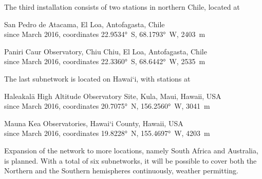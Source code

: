         The third installation consists of two stations in northern Chile, located at
        \begin{description}[leftmargin = 25mm]
            \item[SP]       San Pedro de Atacama, El Loa, Antofagasta, Chile\\
                            since March 2016, coordinates \ang{22.9534}~S, \ang{68.1793}~W, \SI{2403}{\metre}
            \item[PC]       Paniri Caur Observatory, Chiu Chiu, El Loa, Antofagasta, Chile\\
                            since March 2016, coordinates \ang{22.3360}~S, \ang{68.6442}~W, \SI{2535}{\metre}
        \end{description}

        The last subnetwork is located on Hawai`i, with stations at
        \begin{description}[leftmargin = 25mm]
            \item[HK]       Haleakalā High Altitude Observatory Site, Kula, Maui, Hawaii, USA\\
                            since March 2016, coordinates \ang{20.7075}~N, \ang{156.2560}~W, \SI{3041}{\metre} 
            \item[MK]       Mauna Kea Observatories, Hawai`i County, Hawaii, USA\\
                            since March 2016, coordinates \ang{19.8228}~N, \ang{155.4697}~W, \SI{4203}{\metre} 
        \end{description}


        Expansion of the network to more locations, namely South Africa and Australia, is planned.
        With a total of six subnetworks, it will be possible to cover both the Northern and
        the Southern hemispheres continuously, weather permitting.
